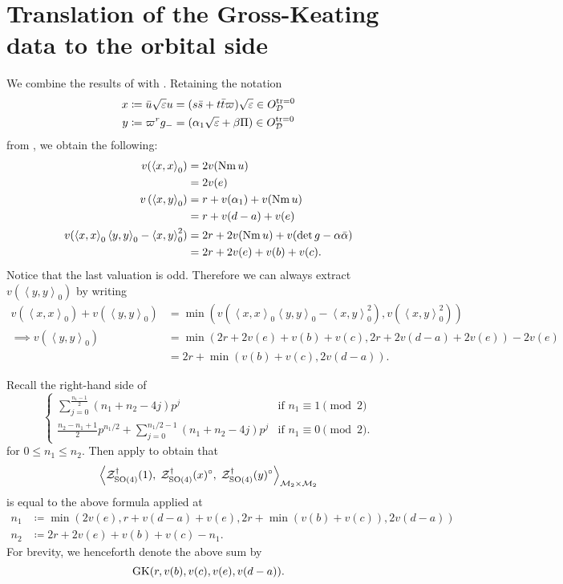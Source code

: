 \section{Translation of the Gross-Keating data to the orbital side}
We combine the results of  with .
Retaining the notation
\begin{align*}
  x &\coloneqq \bar u \sqrt{\varepsilon} u = (s \bar s + t \bar t \varpi) \sqrt{\varepsilon} \in O_\mathcal D^{\operatorname{tr} = 0} \\
  y &\coloneqq \varpi^r g_- = (\alpha_1\sqrt{\varepsilon} + \beta \Pi) \in O_\mathcal D^{\operatorname{tr} = 0}
\end{align*}
from , we obtain the following:
\begin{align*}
  v(\left\langle x,x \right\rangle _0)
    &= 2 v(\operatorname{Nm} u) \\
    &= 2v(e) \\
  v\left( \left\langle x,y \right\rangle _0 \right)
    &= r + v(\alpha_1) + v(\operatorname{Nm} u) \\
    &= r + v(d-a) + v(e) \\
  v(
    \left\langle x,x \right\rangle _0 \left\langle y,y \right\rangle _0
    - \left\langle x,y \right\rangle^2_0
  )
    &= 2r + 2 v(\operatorname{Nm} u) + v(\det g - \alpha \bar \alpha) \\
    &= 2r + 2v(e) + v(b) + v(c).
\end{align*}
Notice that the last valuation is odd.
Therefore we can always extract $v(\left\langle y,y \right\rangle _0)$ by writing
\begin{align*}
  v\left(\left\langle x,x \right\rangle _0\right) + v\left(\left\langle y,y \right\rangle _0\right)
  &= \min \left( v\left( \left\langle x,x \right\rangle _0 \left\langle y,y \right\rangle _0 - \left\langle x,y \right\rangle^2_0 \right),
    v(\left\langle x,y \right\rangle^2_0) \right) \\
  \implies  v\left(\left\langle y,y \right\rangle _0\right)
  &= \min(2r + 2v(e) + v(b) + v(c), 2r + 2v(d-a) + 2v(e)) - 2v(e) \\
  &= 2r + \min(v(b) + v(c), 2v(d-a)).
\end{align*}

Recall the right-hand side of
\[
  \begin{cases}
    \sum_{j=0}^{\frac{n_1-1}{2}} (n_1+n_2-4j) p^j & \text{if } n_1 \equiv 1 \pmod 2 \\
    \frac{n_2-n_1+1}{2} p^{n_1/2} + \sum_{j=0}^{n_1/2-1} (n_1+n_2-4j) p^j & \text{if } n_1 \equiv 0 \pmod 2.
  \end{cases}
\]
for $0 \le n_1 \le n_2$.
Then apply  to obtain that
\[
  \left< \mathcal Z^{\dagger}_{\operatorname{SO}(4)}(1), \; \mathcal Z^{\dagger}_{\operatorname{SO}(4)}(x)^\circ, \; \mathcal Z^{\dagger}_{\operatorname{SO}(4)}(y)^\circ \right>_{\mathcal M_2 \times \mathcal M_2}
\]
is equal to the above formula applied at
\begin{align*}
  n_1 &\coloneqq \min(2v(e), r+v(d-a)+v(e), 2r+\min(v(b)+v(c)), 2v(d-a)) \\
  n_2 &\coloneqq 2r + 2v(e) + v(b) + v(c) - n_1.
\end{align*}
For brevity, we henceforth denote the above sum by
\[ \operatorname{GK}(r, v(b), v(c), v(e), v(d-a)). \]

